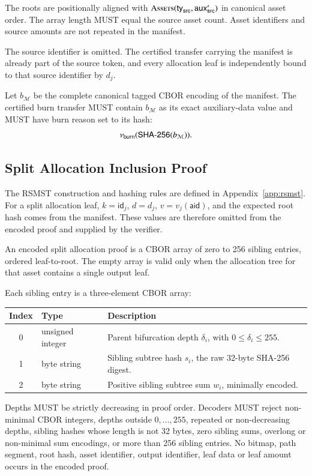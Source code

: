 The roots are positionally aligned with $\Call{Assets}{\mathsf{ty}_\mathsf{src},\auxd'_\mathsf{src}}$ in canonical asset order. The array length MUST equal the source asset count. Asset identifiers and source amounts are not repeated in the manifest.

The source identifier is omitted. The certified transfer carrying the manifest is already part of the source token, and every allocation leaf is independently bound to that source identifier by $d_j$.

Let $b_\mathcal{M}$ be the complete canonical tagged CBOR encoding of the manifest. The certified burn transfer MUST contain $b_\mathcal{M}$ as its exact auxiliary-data value and MUST have burn reason set to its hash:
\[
\nu_\mathsf{burn}(\mathsf{SHA\text{-}256}(b_\mathcal{M})).
\]

\subsection{Split Allocation Inclusion Proof}\label{app:split-allocation-proof}

The RSMST construction and hashing rules are defined in Appendix~\ref{app:rsmst}.  For a split allocation leaf, $k=\mathsf{id}_j$, $d=d_j$, $v=v_j(\mathsf{aid})$, and the expected root hash comes from the manifest.  These values are therefore omitted from the encoded proof and supplied by the verifier.

An encoded split allocation proof is a CBOR array of zero to 256 sibling entries, ordered leaf-to-root.  The empty array is valid only when the allocation tree for that asset contains a single output leaf.

Each sibling entry is a three-element CBOR array:

\begin{longtable}{clp{9cm}}
\textbf{Index} & \textbf{Type} & \textbf{Description} \\
\hline
0 & unsigned integer & Parent bifurcation depth $\delta_i$, with $0\leq\delta_i\leq255$. \\
1 & byte string & Sibling subtree hash $s_i$, the raw 32-byte SHA-256 digest. \\
2 & byte string & Positive sibling subtree sum $w_i$, minimally encoded. \\
\end{longtable}

Depths MUST be strictly decreasing in proof order.  Decoders MUST reject non-minimal CBOR integers, depths outside $0,\ldots,255$, repeated or non-decreasing depths, sibling hashes whose length is not 32 bytes, zero sibling sums, overlong or non-minimal sum encodings, or more than 256 sibling entries.  No bitmap, path segment, root hash, asset identifier, output identifier, leaf data or leaf amount occurs in the encoded proof.

